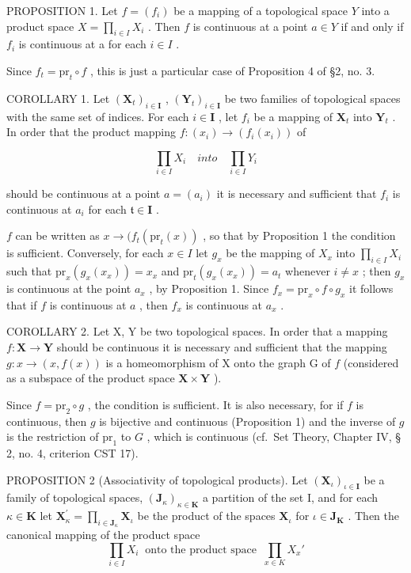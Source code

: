 PROPOSITION 1. Let \(f = (f_{i})\) be a mapping of a topological space \(Y\) into a product space \(X = \prod_{i \in I} X_{i}\) . Then \(f\) is continuous at a point \(a \in Y\) if and only if \(f_{i}\) is continuous at a for each \(i \in I\) .

Since \(f_{t} = \mathrm{pr}_{t} \circ f\) , this is just a particular case of Proposition 4 of §2, no. 3.

COROLLARY 1. Let \((\mathbf{X}_t)_{i \in \mathbf{I}}\) , \((\mathbf{Y}_t)_{i \in \mathbf{I}}\) be two families of topological spaces with the same set of indices. For each \(i \in \mathbf{I}\) , let \(f_i\) be a mapping of \(\mathbf{X}_t\) into \(\mathbf{Y}_t\) . In order that the product mapping \(f: (x_i) \to (f_i(x_i))\) of

\[
\prod_ {i \in I} X _ {i} \quad i n t o \quad \prod_ {i \in I} Y _ {i}
\]

should be continuous at a point \(a = (a_{i})\) it is necessary and sufficient that \(f_{i}\) is continuous at \(a_{i}\) for each \(\mathfrak{t} \in \mathbf{I}\) .

\(f\) can be written as \(x \to (f_{t}(\mathrm{pr}_{t}(x))\) , so that by Proposition 1 the condition is sufficient. Conversely, for each \(x \in I\) let \(g_{x}\) be the mapping of \(X_{x}\) into \(\prod_{i \in I} X_{i}\) such that \(\mathrm{pr}_{x}(g_{x}(x_{x})) = x_{x}\) and \(\mathrm{pr}_{t}(g_{x}(x_{x})) = a_{t}\) whenever \(i \neq x\) ; then \(g_{x}\) is continuous at the point \(a_{x}\) , by Proposition 1. Since \(f_{x} = \mathrm{pr}_{x} \circ f \circ g_{x}\) it follows that if \(f\) is continuous at \(a\) , then \(f_{x}\) is continuous at \(a_{x}\) .

COROLLARY 2. Let X, Y be two topological spaces. In order that a mapping \(f: \mathbf{X} \to \mathbf{Y}\) should be continuous it is necessary and sufficient that the mapping \(g: x \to (x, f(x))\) is a homeomorphism of X onto the graph G of \(f\) (considered as a subspace of the product space \(\mathbf{X} \times \mathbf{Y}\) ).

Since \(f = \mathrm{pr}_2 \circ g\) , the condition is sufficient. It is also necessary, for if \(f\) is continuous, then \(g\) is bijective and continuous (Proposition 1) and the inverse of \(g\) is the restriction of \(\mathrm{pr}_1\) to \(G\) , which is continuous (cf.~Set Theory, Chapter IV, § 2, no. 4, criterion CST 17).

PROPOSITION 2 (Associativity of topological products). Let \((\mathbf{X}_{\iota})_{\iota \in \mathbf{I}}\) be a family of topological spaces, \((\mathbf{J}_{\kappa})_{\kappa \in \mathbf{K}}\) a partition of the set I, and for each \(\kappa \in \mathbf{K}\) let \(\mathbf{X}_{\kappa}^{\prime} = \prod_{i\in \mathbf{J}_{\kappa}}\mathbf{X}_{\iota}\) be the product of the spaces \(\mathbf{X}_{\iota}\) for \(\iota \in \mathbf{J}_{\mathbf{K}}\) . Then the canonical mapping of the product space
\relax{}
\[\prod_{i \in I} X_i\ \text{ onto the product space }\ \prod_{x \in K} X_x'\]

